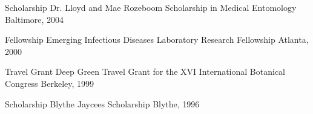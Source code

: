

\begin{cvhonors}

  \cvhonor
    {Scholarship} %
    {Dr. Lloyd and Mae Rozeboom Scholarship in Medical Entomology} %
    {Baltimore, } %
    {2004} %

  \cvhonor
    {Fellowship} %
    {Emerging Infectious Diseases Laboratory Research Fellowship} %
    {Atlanta, } %
    {2000} %

  \cvhonor
    {Travel Grant} %
    {Deep Green Travel Grant for the XVI International Botanical Congress} %
    {Berkeley, } %
    {1999} %

  \cvhonor
    {Scholarship} %
    {Blythe Jaycees Scholarship} %
    {Blythe, } %
    {1996} %

\end{cvhonors}
